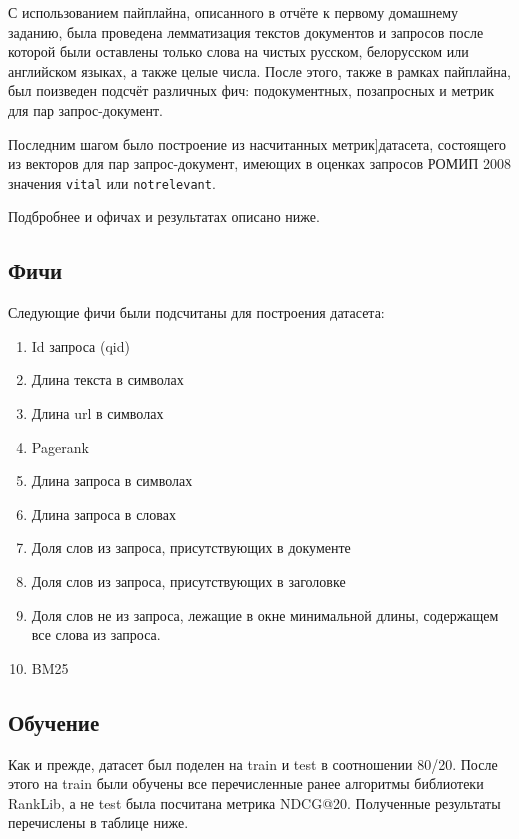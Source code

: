 С использованием пайплайна, описанного в отчёте к первому домашнему заданию, была проведена лемматизация текстов документов и запросов после которой были оставлены только слова на чистых русском, белорусском или английском языках, а также целые числа. После этого, также в рамках пайплайна, был поизведен подсчёт различных фич: подокументных, позапросных и метрик для пар запрос-документ.

Последним шагом было построение из насчитанных метрик]датасета, состоящего из векторов для пар запрос-документ, имеющих в оценках запросов РОМИП 2008 значения \texttt{vital} или \texttt{notrelevant}.

Подбробнее и офичах и результатах описано ниже.

\subsection{Фичи}

Следующие фичи были подсчитаны для построения датасета:

\begin{enumerate}
	\item Id запроса (qid)
	\item Длина текста в символах
	\item Длина url в символах
	\item Pagerank
	\item Длина запроса в символах
	\item Длина запроса в словах
	\item Доля слов из запроса, присутствующих в документе
	\item Доля слов из запроса, присутствующих в заголовке
	\item Доля слов не из запроса, лежащие в окне минимальной длины, содержащем все слова из запроса.
	\item BM25
\end{enumerate}

\subsection{Обучение}

Как и прежде, датасет был поделен на train и test в соотношении 80/20.
После этого на train были обучены все перечисленные ранее алгоритмы библиотеки RankLib, а не test была посчитана метрика NDCG@20. Полученные результаты перечислены в таблице ниже.


